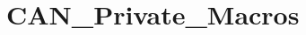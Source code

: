 \hypertarget{group___c_a_n___private___macros}{}\section{C\+A\+N\+\_\+\+Private\+\_\+\+Macros}
\label{group___c_a_n___private___macros}
